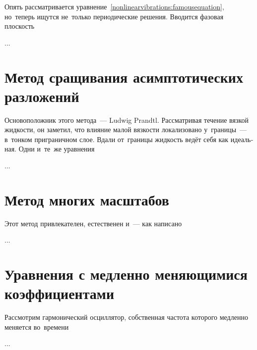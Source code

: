 
\begin{otherlanguage}{russian}

Опять рассматривается уравнение~\eqref{nonlinearvibrations:famousequation}, но~теперь ищутся не~только периодические решения. Вводится фазовая плоскость

...




\section{Метод сращивания асимптотических разложений}

Основоположник этого метода~--- Ludwig Prandtl. Рассматривая течение вязкой жидкости, он заметил, что влияние малой вязкости локализовано у~границы~--- в~тонком приграничном слое. Вдали от~границы жидкость ведёт себя как идеальная. Одни и~те~же уравнения

...




\section{Метод многих масштабов}

Этот метод привлекателен, естественен и~--- как написано

...




\section{Уравнения с медленно меняющимися коэффициентами}

Рассмотрим гармонический осциллятор, собственная частота которого медленно меняется во~времени

...



\end{otherlanguage}



